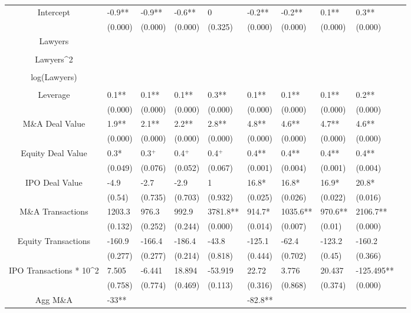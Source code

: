 \documentclass{article}
\begin{document}
\begin{table}[H]
\begin{tabular}{|clllllllll|}
Intercept & -0.9** & -0.9** & -0.6** & 0 & -0.2** & -0.2** & 0.1** & 0.3** & \\
   & (0.000) & (0.000) & (0.000) & (0.325) & (0.000) & (0.000) & (0.000) & (0.000) & \\
  Lawyers &  &  &  &  &  &  &  &  & \\
   &  &  &  &  &  &  &  &  & \\
  Lawyers^2 &  &  &  &  &  &  &  &  & \\
   &  &  &  &  &  &  &  &  & \\
  log(Lawyers) &  &  &  &  &  &  &  &  & \\
   &  &  &  &  &  &  &  &  & \\
  Leverage & 0.1** & 0.1** & 0.1** & 0.3** & 0.1** & 0.1** & 0.1** & 0.2** & \\
   & (0.000) & (0.000) & (0.000) & (0.000) & (0.000) & (0.000) & (0.000) & (0.000) & \\
  M\&A Deal Value & 1.9** & 2.1** & 2.2** & 2.8** & 4.8** & 4.6** & 4.7** & 4.6** & \\
   & (0.000) & (0.000) & (0.000) & (0.000) & (0.000) & (0.000) & (0.000) & (0.000) & \\
  Equity Deal Value & 0.3* & 0.3$^{+}$ & 0.4$^{+}$ & 0.4$^{+}$ & 0.4** & 0.4** & 0.4** & 0.4** & \\
   & (0.049) & (0.076) & (0.052) & (0.067) & (0.001) & (0.004) & (0.001) & (0.004) & \\
  IPO Deal Value & -4.9 & -2.7 & -2.9 & 1 & 16.8* & 16.8* & 16.9* & 20.8* & \\
   & (0.54) & (0.735) & (0.703) & (0.932) & (0.025) & (0.026) & (0.022) & (0.016) & \\
  M\&A Transactions & 1203.3 & 976.3 & 992.9 & 3781.8** & 914.7* & 1035.6** & 970.6** & 2106.7** & \\
   & (0.132) & (0.252) & (0.244) & (0.000) & (0.014) & (0.007) & (0.01) & (0.000) & \\
  Equity Transactions & -160.9 & -166.4 & -186.4 & -43.8 & -125.1 & -62.4 & -123.2 & -160.2 & \\
   & (0.277) & (0.277) & (0.214) & (0.818) & (0.444) & (0.702) & (0.45) & (0.366) & \\
  IPO Transactions * 10^2 & 7.505 & -6.441 & 18.894 & -53.919 & 22.72 & 3.776 & 20.437 & -125.495** & \\
   & (0.758) & (0.774) & (0.469) & (0.113) & (0.316) & (0.868) & (0.374) & (0.000) & \\
  Agg M\&A & -33** &  &  &  & -82.8** &  &  &  & \\

\end{tabular}
\end{table}
\end{document}
